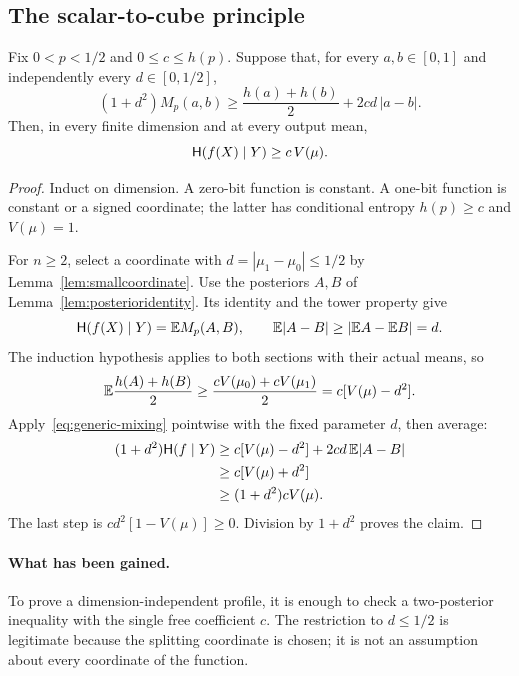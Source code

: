 \subsection{The scalar-to-cube principle}
\begin{proposition}\label{prop:induction}
Fix $0<p<1/2$ and $0\le c\le h(p)$. Suppose that, for every $a,b\in[0,1]$ and independently every $d\in[0,1/2]$,
\begin{equation}\label{eq:generic-mixing}
 (1+d^2)M_p(a,b)\ge\frac{h(a)+h(b)}2+2cd\,|a-b|.
\end{equation}
Then, in every finite dimension and at every output mean,
\begin{equation}\label{eq:generic-profile}
 \mathsf H(f(X)\mid Y)\ge c\,V(\mu).
\end{equation}
\end{proposition}
\begin{proof}
Induct on dimension. A zero-bit function is constant. A one-bit function is constant or a signed coordinate; the latter has conditional entropy $h(p)\ge c$ and $V(\mu)=1$.

For $n\ge2$, select a coordinate with $d=|\mu_1-\mu_0|\le1/2$ by Lemma~\ref{lem:smallcoordinate}. Use the posteriors $A,B$ of Lemma~\ref{lem:posterioridentity}. Its identity and the tower property give
\begin{equation}\label{eq:parent}
 \mathsf H(f(X)\mid Y)=\mathbb E M_p(A,B),\qquad
 \mathbb E|A-B|\ge|\mathbb E A-\mathbb E B|=d.
\end{equation}
The induction hypothesis applies to both sections with their actual means, so
\[
 \mathbb E\frac{h(A)+h(B)}2\ge
 \frac{cV(\mu_0)+cV(\mu_1)}2=c[V(\mu)-d^2].
\]
Apply~\eqref{eq:generic-mixing} pointwise with the fixed parameter $d$, then average:
\begin{align}\label{eq:generic-induction}
 (1+d^2)\mathsf H(f\mid Y)
 &\ge c[V(\mu)-d^2]+2cd\,\mathbb E|A-B|\notag\\
 &\ge c[V(\mu)+d^2]\notag\\
 &\ge(1+d^2)cV(\mu).
\end{align}
The last step is $cd^2[1-V(\mu)]\ge0$. Division by $1+d^2$ proves the claim.
\end{proof}

\paragraph{What has been gained.}
To prove a dimension-independent profile, it is enough to check a two-posterior inequality with the single free coefficient $c$. The restriction to $d\le1/2$ is legitimate because the splitting coordinate is chosen; it is not an assumption about every coordinate of the function.


